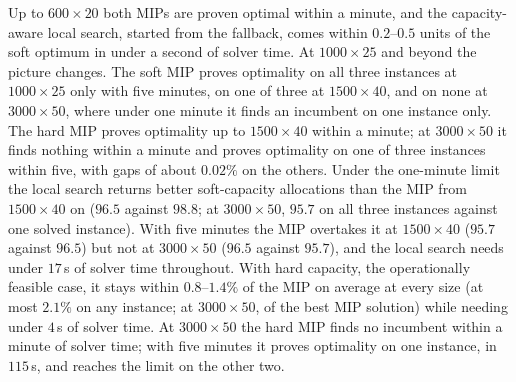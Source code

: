\documentclass[systems,article,accept,moreauthors,pdftex]{Definitions/mdpi}
\begin{document}
Up to $600\times20$ both MIPs are proven optimal within a minute, and the capacity-aware local
search, started from the fallback, comes within $0.2$--$0.5$ units of the soft optimum in under a
second of solver time. At $1000\times25$ and beyond the picture changes. The soft MIP proves
optimality on all three instances at $1000\times25$ only with five minutes, on one of three at
$1500\times40$, and on none at $3000\times50$, where under one minute it finds an incumbent on
one instance only. The hard MIP proves optimality up to $1500\times40$ within a minute; at
$3000\times50$ it finds nothing within a minute and proves optimality on one of three instances
within five, with gaps of about $0.02\%$ on the others. Under the one-minute limit the local
search returns better soft-capacity allocations than the MIP from $1500\times40$ on ($96.5$
against $98.8$; at $3000\times50$, $95.7$ on all three instances against one solved instance).
With five minutes the MIP overtakes it at $1500\times40$ ($95.7$ against $96.5$) but not at
$3000\times50$ ($96.5$ against $95.7$), and the local search needs under $17$\,s of solver time
throughout. With hard capacity, the operationally feasible case, it stays within $0.8$--$1.4\%$
of the MIP on average at every size (at most $2.1\%$ on any instance; at $3000\times50$, of the
best MIP solution) while needing under $4$\,s of solver time. At $3000\times50$
the hard MIP finds no incumbent within a minute of solver time; with five minutes it proves
optimality on one instance, in $115$\,s, and reaches the limit on the other two.
\end{document}
